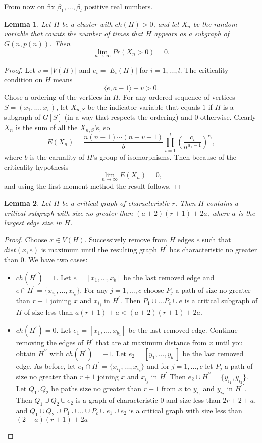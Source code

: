 \documentclass[11pt,notitlepage]{report}
\newtheorem{lemma}{Lemma}[chapter]
\theoremstyle{definition}
\theoremstyle{remark}
\newcommand{\Ln}{\lim\limits_{n\to \infty}}
\begin{document}
From now on fix $\beta_1,\dots,\beta_l$ positive real numbers. 

\begin{lemma}
	Let $H$ be a cluster with $ch(H)>0$, and let $X_n$ be the
	random variable that counts the number of times that $H$ appears
	as a subgraph of $G(n,p(n))$. Then
	\[\Ln Pr(X_n>0)=0. \]
\end{lemma}
\begin{proof}
	Let $v=|V(H)|$ and $e_i=|E_i(H)|$ for $i=1,\dots, l$. 
	The criticality condition on $H$ means 
	\[ \langle e, a-1 \rangle - v > 0 .\]
	Chose a ordering of the vertices in $H$. 
	For any ordered sequence of vertices $S=(x_1, \dots, x_v)$, 
	let $X_{n,S}$ be the indicator variable that equals $1$ if $H$
	is a subgraph of $G[S]$ (in a way that respects the ordering) and
	$0$ otherwise. Clearly $X_n$ is the sum of all the $X_{n,S}$'s, so
	\[ E(X_n)= \frac{n(n-1)\cdots (n-v+1)}{b} \prod_{i=1}^{l}
	\left( \frac{c_i}{n^{a_1-1}}\right) ^{e_i}, \] 
	where $b$ is the carnality of $H$'s group of isomorphisms. 
	Then because of the criticality hypothesis
	\[ \Ln E(X_n)=0, \]
	and using the first moment method 
	the result follows. 
\end{proof}

\begin{lemma}
	Let $H$ be a critical graph of characteristic $r$.
	Then $H$ contains a critical subgraph with size no greater than
	$(a+2)(r+1)+2a$, where $a$ is the largest edge size in $H$. 
\end{lemma}
\begin{proof}
	Choose $x\in V(H)$. Successively remove from $H$ edges $e$
	such that $dist(x, e)$ is maximum until the resulting graph 
	$H^\prime$ has characteristic no greater than $0$. We have two cases:
	\begin{itemize}
		\item $ch(H^\prime)=1$. Let $e=[x_1, \dots, x_b]$ be
		the last removed edge and
		$e\cap H^\prime=\{ x_{i_1}, \dots, x_{i_c}\}$.
		For any $j=1,\dots, c$ choose 
		$P_j$ a path of size no greater than $r+1$ joining
		$x$ and $x_{i_j}$ in $H^\prime$.   
		Then $P_1\cup \dots P_c \cup e$ is a critical subgraph of $H$
		of size less than $a(r+1) + a< (a+2)(r+1) + 2a$.
		\item $ch(H^\prime)=0$. Let $e_1=[x_1, \dots, x_{b_1}]$ be the
		last removed edge. Continue removing the edges of $H^\prime$ 
		that are at maximum distance from $x$ until you obtain 
		$H^{\prime \prime}$ with $ch(H^\prime)=-1$. Let 
		$e_2=[y_1, \dots, y_{b_1}]$ be the last removed edge.
		As before, let $e_1\cap H^\prime=\{ x_{i_1}, \dots, x_{i_c}\}$
		and for $j=1,\dots, c$ let $P_j$ a path of size no greater than $r+1$ 
		joining	$x$ and $x_{i_j}$ in $H^\prime$
		Then $e_2 \cup H^{\prime \prime}=\{ y_{i_1}, y_{i_2}  \}$.
		Let $Q_1, Q_2$ be paths size no greater than $r+1$ from
		$x$ to $y_{i_1}$ and $y_{i_2}$ in $H^{\prime \prime}$.
		Then $Q_1 \cup Q_2 \cup e_2$ is a graph of characteristic $0$ 
		and size less than $2r+2 + a$,
		and $Q_1\cup Q_2\cup P_1 \cup \dots \cup P_c \cup e_1 \cup e_2$ 
		is a critical graph	with size less than $(2+a)(r+1) + 2a$	
	\end{itemize} 
\end{proof}
\end{document}
